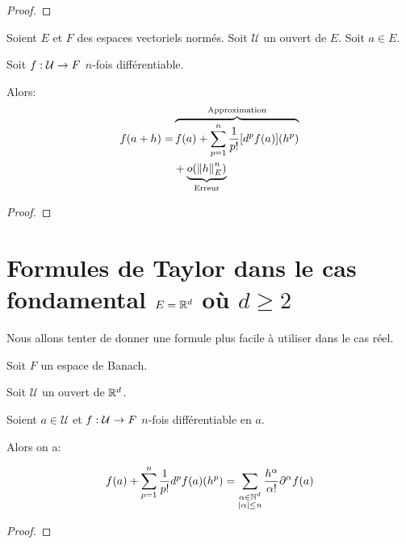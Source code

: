 \ifdefined\outputproof
\begin{proof}

\end{proof}
\fi


\begin{theorem} 
	\label{theorem:taylor_young_formula}
	Soient $E$ et $F$ des espaces vectoriels normés. Soit $\mathcal{U}$ un
	ouvert de $E$. Soit $a \in E$.

	Soit $f : \mathcal{U} \rightarrow F$ $n$-fois différentiable.

	Alors:
	\begin{align*}
		f(a + h) = & \overbrace{f(a) + \displaystyle \sum_{p = 1}^{n} \frac{1}{p!}
		[d^{p}f(a)] (h^{p})}^{\text{Approximation}} \\
		& + \underbrace{o(\norm{h}_{E}^{n})}_{\text{Erreur}}
	\end{align*}
\end{theorem}

\ifdefined\outputproof
\begin{proof}
\end{proof}
\fi

\section{Formules de Taylor dans le cas fondamental $E = \mathbb{R}^{d}$ où $d \geq
2$}

Nous allons tenter de donner une formule plus facile à utiliser dans le cas
réel.


\begin{theorem} 
	\label{theorem:taylor_formula_real_case}
	Soit $F$ un espace de Banach.

	Soit $\mathcal{U}$ un ouvert de $\mathbb{R}^{d}$.

	Soient $a \in \mathcal{U}$ et $f : \mathcal{U} \rightarrow F$ $n$-fois
	différentiable en $a$.

	Alors on a:

	\begin{equation*}
		f(a) + \displaystyle \sum_{p = 1}^{n} \frac{1}{p!} d^{p}f(a)(h^{p}) =
		\sum_{\substack{\alpha \in \mathbb{N}^{d} \\ |\alpha| \leq n}}
		\frac{h^{\alpha}}{\alpha !} \partial^{\alpha}f(a)
	\end{equation*}
\end{theorem}

\ifdefined\outputproof
\begin{proof}

\end{proof}
\fi

